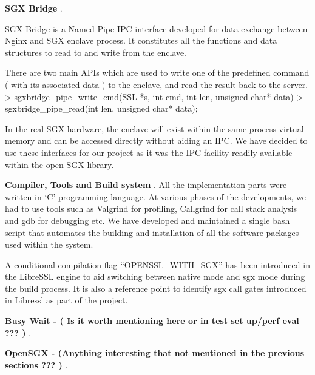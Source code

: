 \documentclass[../main.tex]{subfiles}
\begin{document}
\item \textbf{SGX Bridge }.

SGX Bridge is a Named Pipe IPC interface developed for data exchange between Nginx and SGX enclave process. It constitutes all the functions and data structures to read to and write from the enclave. 

There are two main APIs which are used to write one of the predefined command ( with its  associated data ) to the enclave, and read the result back to the server. 
> sgxbridge_pipe_write_cmd(SSL *s, int cmd, int len, unsigned char* data)
> sgxbridge_pipe_read(int len, unsigned char* data);

In the real SGX hardware, the enclave will exist within the same process virtual memory and can be accessed directly without aiding an IPC. We have decided to use these interfaces for our project as it was the IPC facility readily available within the open SGX library. 

\item \textbf{Compiler, Tools and Build system }.
All the implementation parts were written in ‘C’ programming language. 
At various phases of the developments, we had to use tools such as Valgrind for profiling, Callgrind for call stack analysis and gdb for debugging etc. We have developed and maintained a single bash script that automates the building and installation of  all the software packages used within the system. 

A conditional compilation flag “OPENSSL_WITH_SGX” has been introduced in the LibreSSL engine to aid switching between native mode and sgx mode during the build process. It is also a reference point to identify sgx call gates introduced in Libressl as part of the project.

\item \textbf{ Busy Wait - ( Is it worth mentioning here or in test set up/perf eval ??? ) }.

\item \textbf{ OpenSGX - (Anything interesting that not mentioned in the previous sections ??? ) }.
\end{document}
